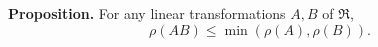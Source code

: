 \textbf{Proposition.} For any linear transformations $A, B$ of $\mathfrak{R}$,
$$\rho(AB) \leq \min(\rho(A), \rho(B)).$$
